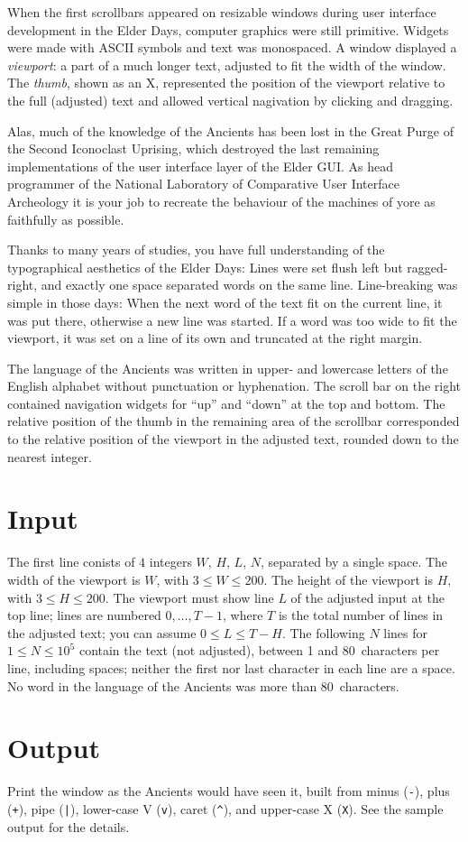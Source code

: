 

When the first scrollbars appeared on resizable windows during user interface development in the Elder Days, computer graphics were still primitive.
Widgets were made with ASCII symbols and text was monospaced.
A window displayed a \emph{viewport}: a part of a much longer text, adjusted to fit the width of the window.
The \emph{thumb}, shown as an X, represented the position of the viewport relative to the full (adjusted) text and allowed vertical nagivation by clicking and dragging.

Alas, much of the knowledge of the Ancients has been lost in the Great Purge of the Second Iconoclast Uprising, which destroyed the last remaining implementations of the user interface layer of the Elder GUI. 
As head programmer of the National Laboratory of Comparative User Interface Archeology it is your job to recreate the behaviour of the machines of yore as faithfully as possible.

Thanks to many years of studies, you have full understanding of the typographical aesthetics of the Elder Days:
Lines were set flush left but ragged-right, and exactly one space separated words on the same line. 
Line-breaking was simple in those days:
When the next word of the text fit on the current line, it was put there, otherwise a new line was started.
If a word was too wide to fit the viewport, it was set on a line of its own and truncated at the right margin.

The language of the Ancients was written in upper- and lowercase letters of the English alphabet without punctuation or hyphenation.
The scroll bar on the right contained navigation widgets for ``up'' and ``down'' at the top and bottom. 
The relative position of the thumb in the remaining area of the scrollbar corresponded to the relative position of the viewport in the adjusted text, rounded down to the nearest integer.


\section*{Input}

The first line conists of $4$ integers $W$, $H$, $L$, $N$, separated by a single space.
The width of the viewport is $W$, with $3\leq W\leq 200$.
The height of the viewport is $H$, with $3\leq H\leq 200$.
The viewport must show line $L$ of the adjusted input at the top line; lines are numbered $0,\ldots, T-1$, where $T$ is the total number of lines in the adjusted text; you can assume $0\leq L \leq T-H$.
The following $N$ lines for $1\leq N\leq 10^5$ contain the text (not adjusted), between 1 and 80~characters per line, including spaces; neither the first nor last character in each line are a space.
No word in the language of the Ancients was more than 80~characters.


\section*{Output}

Print the window as the Ancients would have seen it, built from minus (\verb!-!), plus (\verb!+!), pipe (\verb!|!), lower-case V (\verb!v!), caret (\verb!^!), and upper-case X (\verb!X!).
See the sample output for the details.
